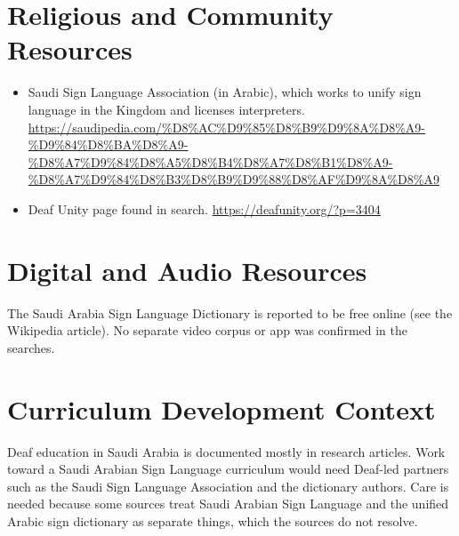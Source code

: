 \documentclass[12pt]{article}
\begin{document}
\section{Religious and Community Resources}
\begin{itemize}
\item Saudi Sign Language Association (in Arabic), which works to unify sign language in the Kingdom and licenses interpreters. \url{https://saudipedia.com/%D8%AC%D9%85%D8%B9%D9%8A%D8%A9-%D9%84%D8%BA%D8%A9-%D8%A7%D9%84%D8%A5%D8%B4%D8%A7%D8%B1%D8%A9-%D8%A7%D9%84%D8%B3%D8%B9%D9%88%D8%AF%D9%8A%D8%A9}
\item Deaf Unity page found in search. \url{https://deafunity.org/?p=3404}
\end{itemize}

\section{Digital and Audio Resources}
The Saudi Arabia Sign Language Dictionary is reported to be free online (see the Wikipedia article). No separate video corpus or app was confirmed in the searches.

\section{Curriculum Development Context}
Deaf education in Saudi Arabia is documented mostly in research articles. Work toward a Saudi Arabian Sign Language curriculum would need Deaf-led partners such as the Saudi Sign Language Association and the dictionary authors. Care is needed because some sources treat Saudi Arabian Sign Language and the unified Arabic sign dictionary as separate things, which the sources do not resolve.
\end{document}
